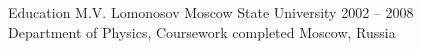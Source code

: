 \documentclass{resume} %
\begin{document}
\begin{rSection}{Education}
M.V. Lomonosov Moscow State University \hfill 2002 -- 2008 \\
Department of Physics, Coursework completed \hfill Moscow, Russia
\end{rSection}
\end{document}
